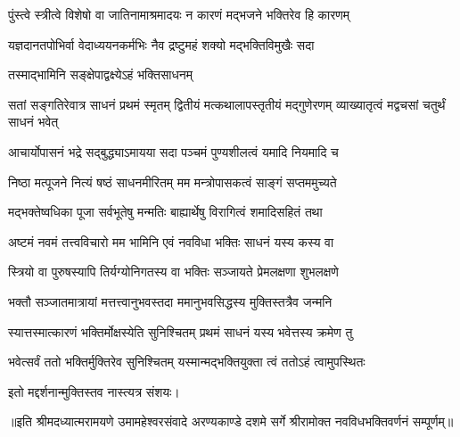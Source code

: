 


\addtocounter{shlokacount}{19}


\twolineshloka
{पुंस्त्वे स्त्रीत्वे विशेषो वा जातिनामाश्रमादयः}
{न कारणं मद्भजने भक्तिरेव हि कारणम्} %

\twolineshloka
{यज्ञदानतपोभिर्वा वेदाध्ययनकर्मभिः}
{नैव द्रष्टुमहं शक्यो मद्भक्तिविमुखैः सदा} %

\onelineshloka
{तस्माद्भामिनि सङ्क्षेपाद्वक्ष्येऽहं भक्तिसाधनम्} %


\threelineshloka
{सतां सङ्गतिरेवात्र साधनं प्रथमं स्मृतम्}
{द्वितीयं मत्कथालापस्तृतीयं मद्गुणेरणम्}
{व्याख्यातृत्वं मद्वचसां चतुर्थं साधनं भवेत्} %

\twolineshloka
{आचार्योपासनं भद्रे सद्बुद्ध्याऽमायया सदा}
{पञ्चमं पुण्यशीलत्वं यमादि नियमादि च} %

\twolineshloka
{निष्ठा मत्पूजने नित्यं षष्ठं साधनमीरितम्}
{मम मन्त्रोपासकत्वं साङ्गं सप्तममुच्यते} %

\twolineshloka
{मद्भक्तेष्वधिका पूजा सर्वभूतेषु मन्मतिः}
{बाह्यार्थेषु विरागित्वं शमादिसहितं तथा} %

\twolineshloka
{अष्टमं नवमं तत्त्वविचारो मम भामिनि}
{एवं नवविधा भक्तिः साधनं यस्य कस्य वा} %

\twolineshloka
{स्त्रियो वा पुरुषस्यापि तिर्यग्योनिगतस्य वा}
{भक्तिः सञ्जायते प्रेमलक्षणा शुभलक्षणे} %

\twolineshloka
{भक्तौ सञ्जातमात्रायां मत्तत्त्वानुभवस्तदा}
{ममानुभवसिद्धस्य मुक्तिस्तत्रैव जन्मनि} %

\twolineshloka
{स्यात्तस्मात्कारणं भक्तिर्मोक्षस्येति सुनिश्चितम्}
{प्रथमं साधनं यस्य भवेत्तस्य क्रमेण तु} %

\twolineshloka
{भवेत्सर्वं ततो भक्तिर्मुक्तिरेव सुनिश्चितम्}
{यस्मान्मद्भक्तियुक्ता त्वं ततोऽहं त्वामुपस्थितः} %


{इतो मद्दर्शनान्मुक्तिस्तव नास्त्यत्र संशयः।}

{॥इति श्रीमदध्यात्मरामयणे उमामहेश्वरसंवादे
अरण्यकाण्डे दशमे सर्गे श्रीरामोक्त  नवविधभक्तिवर्णनं  सम्पूर्णम्॥}
